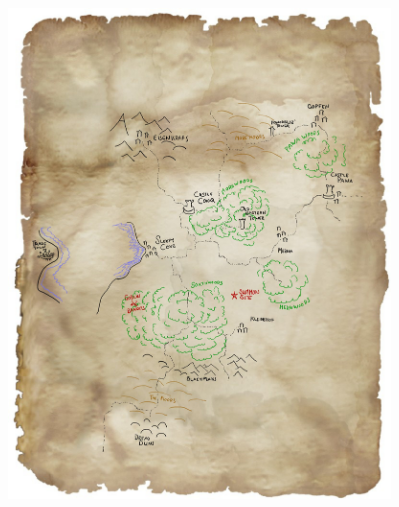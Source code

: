 \begin{center}
\includegraphics[height=130mm]{./map/region-roun-gm.jpg}
\end{center}





%
%






